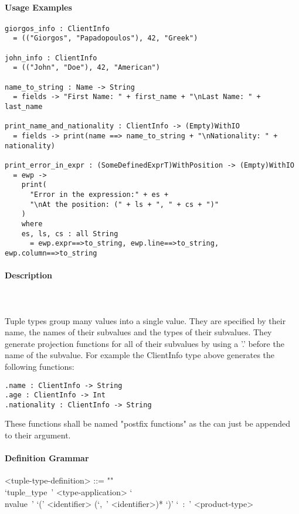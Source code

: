 \documentclass{article}
\def\pend{\mbox{} \\\\}
\begin{document}
\paragraph{Usage Examples}

\begin{verbatim}
giorgos_info : ClientInfo
  = (("Giorgos", "Papadopoulos"), 42, "Greek")

john_info : ClientInfo
  = (("John", "Doe"), 42, "American")

name_to_string : Name -> String
  = fields -> "First Name: " + first_name + "\nLast Name: " + last_name

print_name_and_nationality : ClientInfo -> (Empty)WithIO
  = fields -> print(name ==> name_to_string + "\nNationality: " + nationality)

print_error_in_expr : (SomeDefinedExprT)WithPosition -> (Empty)WithIO
  = ewp ->
    print(
      "Error in the expression:" + es +
      "\nAt the position: (" + ls + ", " + cs + ")"
    )
    where
    es, ls, cs : all String
      = ewp.expr==>to_string, ewp.line==>to_string, ewp.column==>to_string
\end{verbatim}

\paragraph{Description}\pend
Tuple types group many values into a single value. They are specified by their name,
the names of their subvalues and the types of their subvalues. They generate 
projection functions for all of their subvalues by using a '.' before the name of 
the subvalue. For example the ClientInfo type above generates the following 
functions:
\begin{verbatim}
.name : ClientInfo -> String
.age : ClientInfo -> Int
.nationality : ClientInfo -> String
\end{verbatim}
These functions shall be named "postfix functions" as the can just be appended to
their argument.

\paragraph{Definition Grammar}
\begin{grammar}
<tuple-type-definition> ::= ""\\
`tuple_type\ ' <type-application>
`\\nvalue\ ' `(' <identifier> (`,\ ' <identifier>)* `)' `\ :\ ' <product-type>
\end{grammar}
\end{document}
